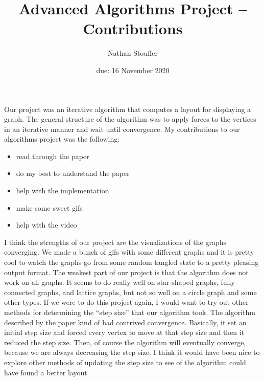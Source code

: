 \documentclass{article}
\title{Advanced Algorithms Project -- Contributions}
\author{Nathan Stouffer}
\date{due: 16 November 2020}
\begin{document}
\maketitle

Our project was an iterative algorithm that computes a layout for displaying a graph.
The general structure of the algorithm was to apply forces to the vertices in an iterative manner and wait until convergence.
My contributions to our algorithms project was the following:
\begin{itemize}
    \item read through the paper
    \item do my best to understand the paper
    \item help with the implementation
    \item make some sweet gifs
    \item help with the video
\end{itemize}
I think the strengths of our project are the visualizations of the graphs converging.
We made a bunch of gifs with some different graphs and it is pretty cool to watch the graphs go from some random tangled state to a pretty pleasing output format.
The weakest part of our project is that the algorithm does not work on all graphs.
It seems to do really well on star-shaped graphs, fully connected graphs, and lattice graphs, but not so well on a circle graph and some other types.
\parspace
If we were to do this project again, I would want to try out other methods for determining the ``step size'' that our algorithm took.
The algorithm described by the paper kind of had contrived convergence.
Basically, it set an initial step size and forced every vertex to move at that step size and then it reduced the step size.
Then, of course the algorithm will eventually converge, because we are always decreasing the step size.
I think it would have been nice to explore other methods of updating the step size to see of the algorithm could have found a better layout.
\end{document}
